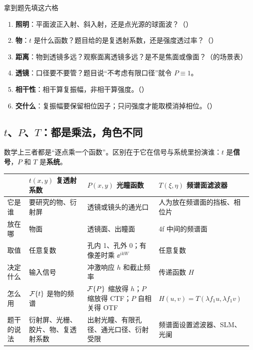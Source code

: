 \begin{recipe}{拿到题先填这六格}
\begin{enumerate}
\item \textbf{照明}：平面波正入射、斜入射，还是点光源的球面波？（\pageref{sec:p-illum}）
\item \textbf{物}：$t$ 是什么函数？题目给的是复透射系数，还是强度透过率？（\pageref{sec:p-tvsP}）
\item \textbf{距离}：物到透镜多远？观察面离透镜多远？是不是焦面或像面？（\pageref{sec:p-scenes}的场景表）
\item \textbf{透镜}：口径要不要管？题目说“不考虑有限口径”就令 $P\equiv1$。
\item \textbf{相干性}：相干算复振幅，非相干算强度。（\pageref{sec:p-cohtable}）
\item \textbf{交什么}：复振幅要保留相位因子；只问强度才能取模消掉相位。（\pageref{sec:p-ledger}）
\end{enumerate}
\end{recipe}

\subsection*{$t$、$P$、$T$：都是乘法，角色不同}\label{sec:p-tvsP}
数学上三者都是“逐点乘一个函数”。区别在于它在信号与系统里扮演谁：$t$ 是\textbf{信号}，$P$ 和 $T$ 是\textbf{系统}。
\begin{center}\small\renewcommand{\arraystretch}{1.35}
\begin{tabular}{@{}P{2.2cm}P{4.7cm}P{4.9cm}P{4.5cm}@{}}
\toprule
 & $t(x,y)$ 复透射系数 & $P(x,y)$ 光瞳函数 & $T(\xi,\eta)$ 频谱面滤波器\\ \midrule
它是谁 & 要研究的物、衍射屏 & 透镜或镜头的通光口 & 人为放在频谱面的挡板、相位片\\
放在哪 & 物面 & 透镜面、出瞳面 & 4f 中间的频谱面\\
取值 & 任意复数 & 孔内 1、孔外 0；有像差时乘 $\ee^{ikW}$ & 任意复数\\
决定什么 & 输入信号 & 冲激响应 $h$ 和截止频率 & 传递函数 $H$\\
怎么用 & $\mathcal{F}\{t\}$ 是物的频谱 & $\mathcal{F}\{P\}$ 缩放得 $h$；$P$ 缩放得 CTF；$P$ 自相关得 OTF & $H(u,v)=T(\lambda f_1u,\lambda f_1v)$\\
题干的说法 & 衍射屏、光栅、胶片、物、复透射系数 & 出射光瞳、有限孔径、通光口径、衍射受限 & 频谱面设置滤波器、SLM、光阑\\
\bottomrule
\end{tabular}
\end{center}

